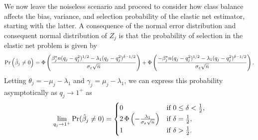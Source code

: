 We now leave the noiseless scenario and proceed to consider how class balance affects the
bias, variance, and selection probability of the elastic net estimator, starting with the
latter. A consequence of the normal error distribution and consequent normal distribution
of \({Z_j}\) is that the probability of selection in the elastic net problem is given by
\begin{equation}
  \label{eq:selection-probability}
  \Pr\left(\hat{\beta}_j \neq 0\right)
  = \operatorname{\Phi} \left( \frac{\beta_j^*n (q_j-q_j^2)^{1/2} - \lambda_1(q_j-q_j^2)^{\delta - 1/2}}{\sigma_\varepsilon \sqrt{n}}\right)                 + \operatorname{\Phi} \left( \frac{-\beta_j^*n (q_j-q_j^2)^{1/2} - \lambda_1(q_j-q_j^2)^{\delta - 1/2}}{\sigma_\varepsilon \sqrt{n}}\right).
\end{equation}
Letting \(\theta_j = -\mu_j - \lambda_1 \) and \(\gamma_j = \mu_j - \lambda_1\), we can
express this probability asymptotically as \(q_j \rightarrow 1^+\) as
\begin{equation}
  \label{eq:selection-probability-limit}
  \lim_{q_j \rightarrow 1^+} \Pr(\hat{\beta}_j \neq 0) =
  \begin{cases}
    0                                                                & \text{if } 0 \leq \delta < \frac{1}{2}, \\
    2\operatorname{\Phi}\left(-\frac{\lambda_1}{\sigma_\varepsilon \sqrt{n}}\right) & \text{if } \delta = \frac{1}{2},        \\
    1                                                                & \text{if } \delta > \frac{1}{2}.
  \end{cases}
\end{equation}

